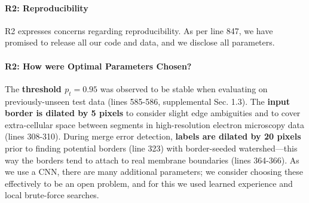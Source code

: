 \documentclass[10pt,twocolumn,letterpaper]{article}
\begin{document}
\paragraph{R2: Reproducibility}
R2 expresses concerns regarding reproducibility. As per line 847, we have promised to release all our code and data, and we disclose all parameters.

\paragraph{R2: How were Optimal Parameters Chosen?}
The \textbf{threshold $p_t=0.95$} was observed to be stable when evaluating on previously-unseen test data (lines 585-586, supplemental Sec. 1.3). The \textbf{input border is dilated by 5 pixels} to consider slight edge ambiguities and to cover extra-cellular space between segments in high-resolution electron microscopy data (lines 308-310). During merge error detection, \textbf{labels are dilated by 20 pixels} prior to finding potential borders (line 323) with border-seeded watershed---this way the borders tend to attach to real membrane boundaries (lines 364-366). As we use a CNN, there are many additional parameters; we consider choosing these effectively to be an open problem, and for this we used learned experience and local brute-force searches.

%
\end{document}
